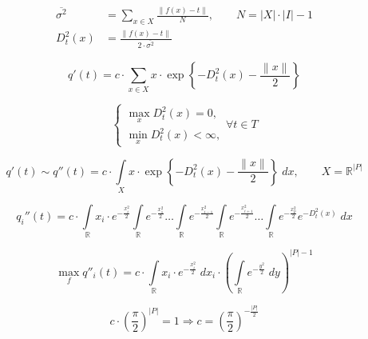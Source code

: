 \begin{equation*}
  \begin{split}
    \overline{\sigma^2}
      &= \sum_{x \in X} \frac{\left\| f\left( x \right) - t \right\|}{N}, \qquad
      N = \left| X \right| \cdot \left| I \right| - 1 \\
    D_t^2\left( x \right)
      &= \frac{\left\| f\left( x \right) - t \right\|}
              {2 \cdot \overline{\sigma^2}}
  \end{split}
\end{equation*}

\begin{equation*}
  q'\left( t \right)
  =
  c \cdot
  \sum_{x \in X}
  x
  \cdot \exp{\left\{
    - D_t^2\left( x \right)
    - \frac{\left\| x \right\|}{2} \right\}}
\end{equation*}

\begin{equation*}
  \begin{cases}
    \max\limits_{x} D_t^2\left( x \right) = 0, \\
    \min\limits_{x} D_t^2\left( x \right) < \infty,
  \end{cases} \forall t \in T
\end{equation*}

\begin{equation*}
  q'\left( t \right)
  \sim
  q''\left( t \right)
  =
  c \cdot
  \int\limits_{X}
    x
    \cdot \exp{\left\{
      - D_t^2\left( x \right)
      - \frac{\left\| x \right\|}{2} \right\}} \;dx, \qquad
  X = \mathbb{R}^{\left| P \right|}
\end{equation*}

\begin{equation*}
  q_i''\left( t \right)
  =
  c \cdot
  \int\limits_{\mathbb{R}} x_i \cdot e^{- \frac{x_i^2}{2}}
  \int\limits_{\mathbb{R}} e^{- \frac{x_1^2}{2}}
  \dots
  \int\limits_{\mathbb{R}} e^{- \frac{x_{i-1}^2}{2}}
  \int\limits_{\mathbb{R}} e^{- \frac{x_{i+1}^2}{2}}
  \dots
  \int\limits_{\mathbb{R}} e^{- \frac{x_p^2}{2}} e^{-D_t^2\left( x \right)}
  \;dx
\end{equation*}

\begin{equation*}
  \max_f{q''_i\left( t \right)}
  =
  c \cdot
  \int\limits_{\mathbb{R}} x_i \cdot e^{- \frac{x_i^2}{2}} \;dx_i
  \cdot
  \left(
    \int\limits_{\mathbb{R}} e^{- \frac{y^2}{2}} \;dy
  \right)^{\left| P \right| - 1}
\end{equation*}

\begin{equation*}
  c \cdot \left( \frac{\pi}{2} \right)^{\left| P \right|} = 1
  \Longrightarrow
  c = \left( \frac{\pi}{2} \right)^{- \frac{\left| P \right|}{2}}
\end{equation*}

